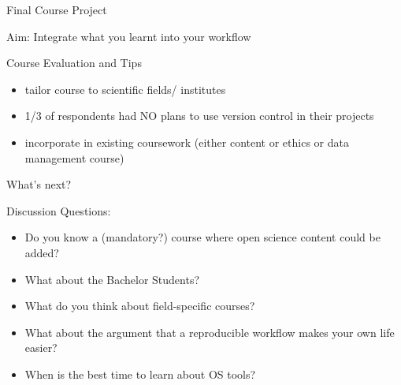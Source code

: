 \documentclass [t,11pt] {beamer}
\begin{document}

\begin {frame} { Final Course Project}

Aim: Integrate what you learnt into your workflow

\end {frame}


\begin {frame} {Course Evaluation and Tips}
\begin {itemize}
\item tailor course to scientific fields/ institutes
\item 1/3 of respondents had NO plans to use version control in their projects
\item incorporate in existing coursework (either content or ethics or data management course)
\end {itemize}

\end {frame}

\begin {frame} {What's next?}

Discussion Questions:
\begin {itemize}
\item Do you know a (mandatory?) course where open science content could be added?
\item What about the Bachelor Students?
\item What do you think about field-specific courses?
\item What about the argument that a reproducible workflow makes your own life easier?
\item When is the best time to learn about OS tools?
\end {itemize}

\end {frame}
\end{document}
